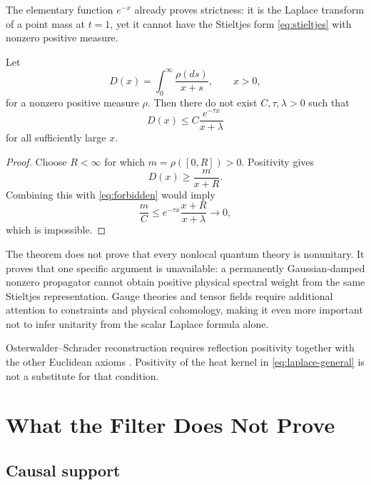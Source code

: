 \documentclass[11pt]{article}
\begin{document}
The elementary function \(e^{-x}\) already proves strictness: it is the
Laplace transform of a point mass at \(t=1\), yet it cannot have the
Stieltjes form \eqref{eq:stieltjes} with nonzero positive measure.

\begin{theorem}
\label{thm:no-go}
Let
\[
 D(x)=\int_0^\infty\frac{\rho(ds)}{x+s},
 \qquad x>0,
\]
for a nonzero positive measure \(\rho\). Then there do not exist
\(C,\tau,\lambda>0\) such that
\begin{equation}
 D(x)\leq C\frac{e^{-\tau x}}{x+\lambda}
 \label{eq:forbidden}
\end{equation}
for all sufficiently large \(x\).
\end{theorem}

\begin{proof}
Choose \(R<\infty\) for which \(m=\rho([0,R])>0\). Positivity gives
\[
 D(x)\geq\frac{m}{x+R}.
\]
Combining this with \eqref{eq:forbidden} would imply
\[
 \frac{m}{C}
 \leq e^{-\tau x}\frac{x+R}{x+\lambda}\longrightarrow0,
\]
which is impossible.
\end{proof}

\begin{remark}
The theorem does not prove that every nonlocal quantum theory is nonunitary.
It proves that one specific argument is unavailable: a permanently
Gaussian-damped nonzero propagator cannot obtain positive physical spectral
weight from the same Stieltjes representation. Gauge theories and tensor
fields require additional attention to constraints and physical
cohomology, making it even more important not to infer unitarity from the
scalar Laplace formula alone.
\end{remark}

Osterwalder--Schrader reconstruction requires reflection positivity together
with the other Euclidean axioms \cite{OsterwalderSchrader1973,
OsterwalderSchrader1975}. Positivity of the heat kernel in
\eqref{eq:laplace-general} is not a substitute for that condition.

\section{What the Filter Does Not Prove}

\subsection{Causal support}
\end{document}
